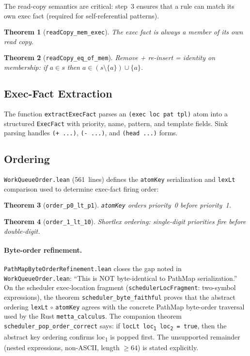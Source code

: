 \documentclass[11pt]{article}
\newtheorem{theorem}{Theorem}[section]
\theoremstyle{definition}
\theoremstyle{remark}
\begin{document}
\noindent
The read-copy semantics are critical: step~3 ensures that a rule can
match its own exec fact (required for self-referential patterns).

\begin{theorem}[\texttt{readCopy\_mem\_exec}]
The exec fact is always a member of its own read copy.
\end{theorem}

\begin{theorem}[\texttt{readCopy\_eq\_of\_mem}]
Remove + re-insert = identity on membership: if $a \in s$ then
$a \in (s \setminus \{a\}) \cup \{a\}$.
\end{theorem}

\subsection{Exec-Fact Extraction}

The function \texttt{extractExecFact} parses an \texttt{(exec loc pat tpl)}
atom into a structured \texttt{ExecFact} with priority, name, pattern, and
template fields.  Sink parsing handles \texttt{(+ ...)}, \texttt{(- ...)},
and \texttt{(head ...)} forms.

\subsection{Ordering}

\texttt{WorkQueueOrder.lean} (561~lines) defines the
\texttt{atomKey} serialization and \texttt{lexLt} comparison used to
determine exec-fact firing order:

\begin{theorem}[\texttt{order\_p0\_lt\_p1}]
\texttt{atomKey} orders priority~0 before priority~1.
\end{theorem}

\begin{theorem}[\texttt{order\_1\_lt\_10}]
Shortlex ordering: single-digit priorities fire before double-digit.
\end{theorem}

\paragraph{Byte-order refinement.}
\texttt{PathMapByteOrderRefinement.lean} closes the gap noted in
\texttt{WorkQueueOrder.lean}: ``This is NOT byte-identical to PathMap
serialization.''  On the scheduler exec-location fragment
(\texttt{schedulerLocFragment}: two-symbol expressions), the theorem
\texttt{scheduler\_byte\_faithful} proves that the abstract ordering
\texttt{lexLt} $\circ$ \texttt{atomKey} agrees with the concrete PathMap
byte-order traversal used by the Rust \texttt{metta\_calculus}.
The companion theorem \texttt{scheduler\_pop\_order\_correct} says:
if \texttt{locLt loc\textsubscript{1} loc\textsubscript{2} = true}, then the
abstract key ordering confirms loc\textsubscript{1} is popped first.
The unsupported remainder (nested expressions, non-ASCII, length $\geq 64$)
is stated explicitly.
\end{document}
